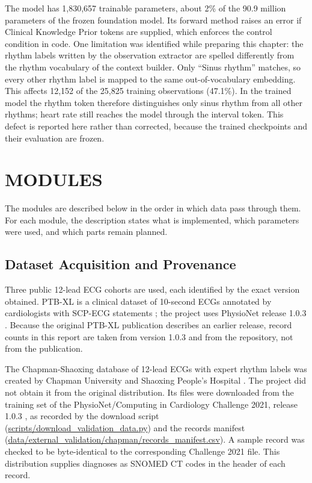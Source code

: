 The model has 1,830,657 trainable parameters, about 2\% of the 90.9 million parameters of the frozen foundation model. Its forward method raises an error if Clinical Knowledge Prior tokens are supplied, which enforces the control condition in code. One limitation was identified while preparing this chapter: the rhythm labels written by the observation extractor are spelled differently from the rhythm vocabulary of the context builder. Only ``Sinus rhythm'' matches, so every other rhythm label is mapped to the same out-of-vocabulary embedding. This affects 12,152 of the 25,825 training observations (47.1\%). In the trained model the rhythm token therefore distinguishes only sinus rhythm from all other rhythms; heart rate still reaches the model through the interval token. This defect is reported here rather than corrected, because the trained checkpoints and their evaluation are frozen.

\section{MODULES}
The modules are described below in the order in which data pass through them. For each module, the description states what is implemented, which parameters were used, and which parts remain planned.

\subsection{Dataset Acquisition and Provenance}
Three public 12-lead ECG cohorts are used, each identified by the exact version obtained. PTB-XL is a clinical dataset of 10-second ECGs annotated by cardiologists with SCP-ECG statements \cite{WAGNER2020PTBXL}; the project uses PhysioNet release 1.0.3 \cite{WAGNER2022PTBXLDATA}. Because the original PTB-XL publication describes an earlier release, record counts in this report are taken from version 1.0.3 and from the repository, not from the publication.

The Chapman-Shaoxing database of 12-lead ECGs with expert rhythm labels was created by Chapman University and Shaoxing People's Hospital \cite{ZHENG2020CHAPMAN}. The project did not obtain it from the original distribution. Its files were downloaded from the training set of the PhysioNet/Computing in Cardiology Challenge 2021, release 1.0.3 \cite{REYNA2022ISSUES,CINC2021DATA}, as recorded by the download script (\url{scripts/download_validation_data.py}) and the records manifest (\url{data/external_validation/chapman/records_manifest.csv}). A sample record was checked to be byte-identical to the corresponding Challenge 2021 file. This distribution supplies diagnoses as SNOMED CT codes in the header of each record.

